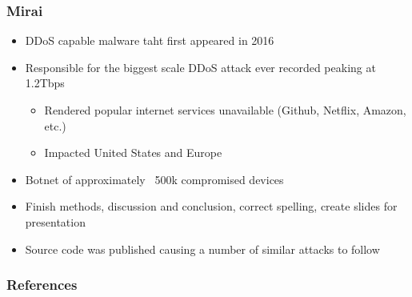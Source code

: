 \documentclass[10pt, presentation]{beamer}
\begin{document}
\begin{frame}
\frametitle{Mirai}
  \begin{itemize}
    \item DDoS capable malware taht first appeared in 2016
    \item Responsible for the biggest scale DDoS attack ever recorded peaking at 1.2Tbps
    \begin{itemize}
        \item Rendered popular internet services unavailable (Github, Netflix, Amazon, etc.)
        \item Impacted United States and Europe
    \end{itemize}
    \item Botnet of approximately ~500k compromised devices
    \item Finish methods, discussion and conclusion, correct spelling, create slides for presentation
    \item Source code was published causing a number of similar attacks to follow
  \end{itemize}
\end{frame}


    \begin{frame}
        \frametitle{References}
        \printbibliography
    \end{frame}
\end{document}
